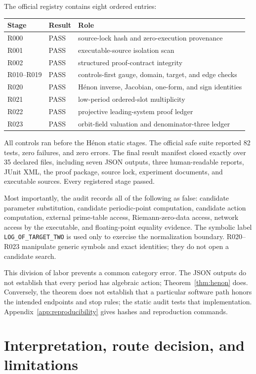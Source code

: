 \documentclass[11pt]{article}
\theoremstyle{definition}
\theoremstyle{remark}
\begin{document}
The official registry contains eight ordered entries:
\begin{center}
\begin{tabular}{@{}lll@{}}
\toprule
Stage & Result & Role \\
\midrule
R000 & PASS & source-lock hash and zero-execution provenance \\
R001 & PASS & executable-source isolation scan \\
R002 & PASS & structured proof-contract integrity \\
R010--R019 & PASS & controls-first gauge, domain, target, and edge checks \\
R020 & PASS & H\'enon inverse, Jacobian, one-form, and sign identities \\
R021 & PASS & low-period ordered-slot multiplicity \\
R022 & PASS & projective leading-system proof ledger \\
R023 & PASS & orbit-field valuation and denominator-three ledger \\
\bottomrule
\end{tabular}
\end{center}
All controls ran before the H\'enon static stages.  The official safe suite
reported 82 tests, zero failures, and zero errors.  The final result manifest
closed exactly over 35 declared files, including seven JSON outputs, three
human-readable reports, JUnit XML, the proof package, source lock, experiment
documents, and executable sources.  Every registered stage passed.

Most importantly, the audit records all of the following as false: candidate
parameter substitution, candidate periodic-point computation, candidate
action computation, external prime-table access, Riemann-zero-data access,
network access by the executable, and floating-point equality evidence.  The
symbolic label \texttt{LOG\_OF\_TARGET\_TWO} is used only to exercise the
normalization boundary.  R020--R023 manipulate generic symbols and exact
identities; they do not open a candidate search.

This division of labor prevents a common category error.  The JSON outputs do
not establish that every period has algebraic action; Theorem~\ref{thm:henon}
does.  Conversely, the theorem does not establish that a particular software
path honors the intended endpoints and stop rules; the static audit tests
that implementation.  Appendix~\ref{app:reproducibility} gives hashes and
reproduction commands.

\section{Interpretation, route decision, and limitations}
\label{sec:interpretation}
\end{document}
